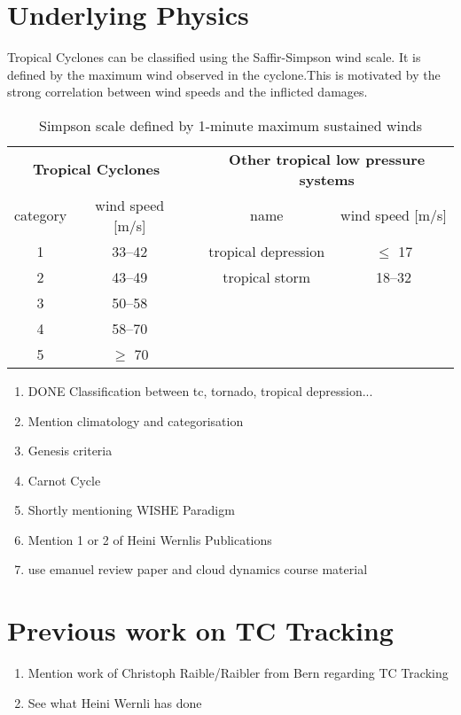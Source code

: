 \section{Underlying Physics}\label{sec:physics}
Tropical Cyclones can be classified using the Saffir-Simpson wind scale. It is defined by the maximum wind observed in the cyclone.This is motivated by the strong correlation between wind speeds and the inflicted damages.\cite{simpson} 
\begingroup
\setlength{\tabcolsep}{10pt} %
\renewcommand{\arraystretch}{1.5} %
\begin{table}[hbt!]
\centering
\begin{tabular}{|c|c|c|c|c|}
\cline{1-2} \cline{4-5}
\multicolumn{2}{|c|}{\textbf{Tropical Cyclones}} &  & \multicolumn{2}{c|}{\textbf{Other tropical low pressure systems}} \\ \cline{1-2} \cline{4-5} 
category     & wind speed {[}m/s{]}     &  & name                & wind speed {[}m/s{]}               \\ \cline{1-2} \cline{4-5} 
1 & 33--42    &  & tropical depression & $\leq$ 17 \\
2 & 43--49    &  & tropical storm      & 18--32    \\
3 & 50--58    &  &                     &           \\
4 & 58--70    &  &                     &           \\
5 & $\geq$ 70 &  &                     &           \\ \cline{1-2} \cline{4-5} 
\end{tabular}
\caption{Simpson scale defined by 1-minute maximum sustained winds}
\label{tab:simpson-scale}
\end{table}
\endgroup

\begin{enumerate}
\item DONE Classification between tc, tornado, tropical depression...
\item Mention climatology and categorisation
\item Genesis criteria
\item Carnot Cycle
\item Shortly mentioning WISHE Paradigm
\item Mention 1 or 2 of Heini Wernlis Publications
\item use emanuel review paper and cloud dynamics course material
\end{enumerate}


\section{Previous work on TC Tracking}\label{sec:tracking}
\begin{enumerate}
\item Mention work of Christoph Raible/Raibler from Bern regarding TC Tracking
\item See what Heini Wernli has done
\end{enumerate}